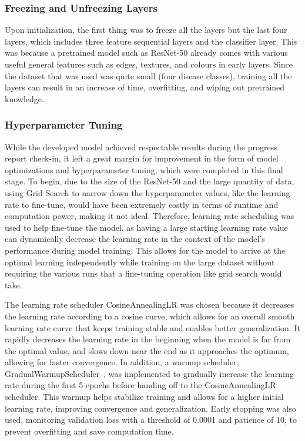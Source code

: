 \documentclass[11pt]{article}
\begin{document}
\subsubsection{Freezing and Unfreezing Layers}

Upon initialization, the first thing was to freeze all the layers but the last four layers, which includes three feature sequential layers and the classifier layer. This was because a pretrained model such as ResNet-50 already comes with various useful general features such as edges, textures, and colours in early layers. Since the dataset that was used was quite small (four disease classes), training all the layers can result in an increase of time, overfitting, and wiping out pretrained knowledge.

\subsubsection{Hyperparameter Tuning}

While the developed model achieved respectable results during the progress report check-in, it left a great margin for improvement in the form of model optimizations and hyperparameter tuning, which were completed in this final stage. To begin, due to the size of the ResNet-50 and the large quantity of data, using Grid Search to narrow down the hyperparameter values, like the learning rate to fine-tune, would have been extremely costly in terms of runtime and computation power, making it not ideal. Therefore, learning rate scheduling was used to help fine-tune the model, as having a large starting learning rate value can dynamically decrease the learning rate in the context of the model's performance during model training. This allows for the model to arrive at the optimal learning independently while training on the large dataset without requiring the various runs that a fine-tuning operation like grid search would take.

The learning rate scheduler CosineAnnealingLR was chosen because it decreases the learning rate according to a cosine curve, which allows for an overall smooth learning rate curve that keeps training stable and enables better generalization. It rapidly decreases the learning rate in the beginning when the model is far from the optimal value, and slows down near the end as it approaches the optimum, allowing for faster convergence. In addition, a warmup scheduler, GradualWarmupScheduler~\citeyearpar{4RY4N_2025-nr}, was implemented to gradually increase the learning rate during the first 5 epochs before handing off to the CosineAnnealingLR scheduler. This warmup helps stabilize training and allows for a higher initial learning rate, improving convergence and generalization. Early stopping was also used, monitoring validation loss with a threshold of 0.0001 and patience of 10, to prevent overfitting and save computation time.
\end{document}
